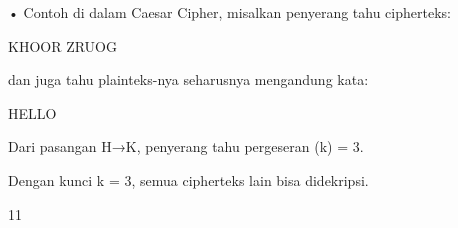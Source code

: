 \documentclass{article}
\begin{document}

• Contoh di dalam Caesar Cipher, misalkan penyerang tahu cipherteks: 

                        KHOOR ZRUOG

    dan juga tahu plainteks-nya seharusnya mengandung kata:

                       HELLO

    Dari pasangan H→K, penyerang tahu pergeseran (k) = 3.

    Dengan kunci k = 3, semua cipherteks lain bisa didekripsi.

11
\end{document}
